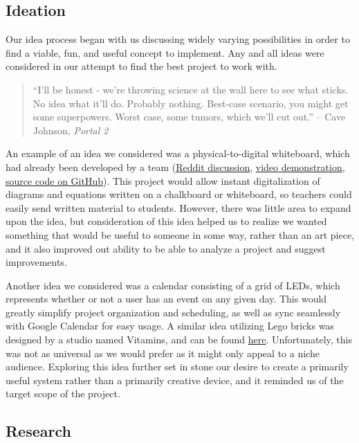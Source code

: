\documentclass[10pt, oneside, letterpaper, titlepage]{article}
\begin{document}
		\subsection{Ideation}

			Our idea process began with us discussing widely varying possibilities in order to find a viable, fun, and useful concept to implement. Any and all ideas were considered in our attempt to find the best project to work with.

			\begin{quote}
				``I'll be honest - we're throwing science at the wall here to see what sticks. No idea what it'll do. Probably nothing. Best-case scenario, you might get some superpowers. Worst case, some tumors, which we'll cut out.''
				\hfill -- Cave Johnson, \emph{Portal 2}
			\end{quote}

			An example of an idea we considered was a physical-to-digital whiteboard, which had already been developed by a team (\href{https://www.reddit.com/r/arduino/comments/2w4s1y/digitally_encoding_a_chalkboard_with_arduino/}{Reddit discussion}, \href{https://www.youtube.com/watch?v=y1aw0IiamFM}{video demonstration}, \href{https://github.com/string2string/string2string}{source code on GitHub}). This project would allow instant digitalization of diagrams and equations written on a chalkboard or whiteboard, so teachers could easily send written material to students. However, there was little area to expand upon the idea, but consideration of this idea helped us to realize we wanted something that would be useful to someone in some way, rather than an art piece, and it also improved out ability to be able to analyze a project and suggest improvements.

			Another idea we considered was a calendar consisting of a grid of LEDs, which represents whether or not a user has an event on any given day. This would greatly simplify project organization and scheduling, as well as sync seamlessly with Google Calendar for easy usage. A similar idea utilizing Lego bricks was designed by a studio named Vitamins, and can be found \href{http://www.bit-planner.com/}{here}. Unfortunately, this was not as universal as we would prefer as it might only appeal to a niche audience. Exploring this idea further set in stone our desire to create a primarily useful system rather than a primarily creative device, and it reminded us of the target scope of the project.

		\subsection{Research}
\end{document}
